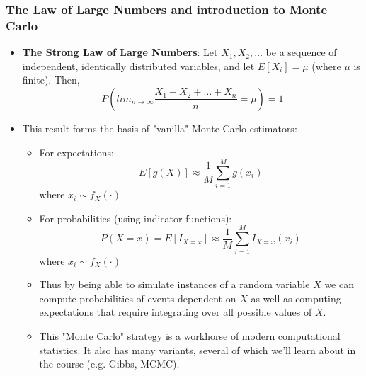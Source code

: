 \documentclass[10pt,containsverbatim,paralist]{article}
\begin{document}
\subsubsection*{The Law of Large Numbers and introduction to Monte Carlo}
\label{sec-1-1-6}
\begin{itemize}
\item \textbf{The Strong Law of Large Numbers}: Let $X_1, X_2, \ldots$ be a sequence of
independent, identically distributed variables, and let $E[X_i]=\mu$ (where
$\mu$ is finite).  Then, $$P(lim_{n \to \infty}
  \frac{X_1+X_2+\ldots+X_n}{n} = \mu) =1 $$
\item This result forms the basis of "vanilla" Monte Carlo estimators:
\begin{itemize}
\item For expectations: $$E[g(X)] \approx \frac{1}{M}\sum_{i=1}^M g(x_i) $$ where $x_i \sim f_X(\cdot)$
\item For probabilities (using indicator functions): $$P(X=x)=E[I_{X=x}] \approx
    \frac{1}{M}\sum_{i=1}^M I_{X=x}(x_i)$$ where $x_i \sim f_X(\cdot)$
\item Thus by being able to simulate instances of a random variable $X$ we can
compute probabilities of events dependent on $X$ as well as computing
expectations that require integrating over all possible values of $X$.
\item This "Monte Carlo" strategy is a workhorse of modern computational
statistics.  It also has many variants, several of which we'll learn about in
the course (e.g. Gibbs, MCMC).
\end{itemize}
\end{itemize}
\end{document}
